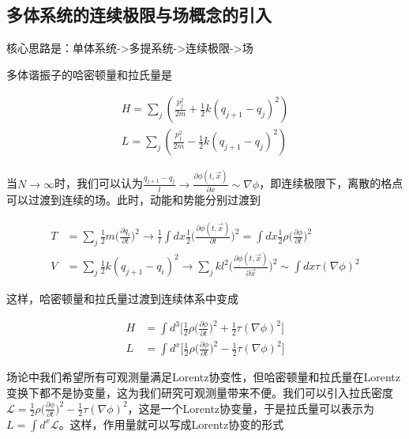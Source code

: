 \subsection{多体系统的连续极限与场概念的引入}

核心思路是：单体系统->多提系统->连续极限->场

多体谐振子的哈密顿量和拉氏量是

\begin{equation}
	\begin{array}{lr}
		H=\sum_{j}(\frac{p_j^2}{2m}+\frac{1}{2}k(q_{j+1}-q_j)^2) \\
		L=\sum_{j}(\frac{p_j^2}{2m}-\frac{1}{2}k(q_{j+1}-q_j)^2)
	\end{array}
\end{equation}

当$N\to\infty$时，我们可以认为$\frac{q_{j+1}-q_j}{l}\to\frac{\partial\phi(t,\vec{x})}{\partial x}\sim\nabla\phi$，即连续极限下，离散的格点可以过渡到连续的场。此时，动能和势能分别过渡到

\begin{equation}
    \begin{split}
        T &= \sum_j\frac{1}{2}m\bigl(\frac{\partial q_i}{\partial t}\bigr)^2 \to \frac{1}{l}\int dx\frac{1}{2}\bigl(\frac{\partial\phi(t,\vec{x})}{\partial t}\bigr)^2 = \int dx\frac{1}{2}\rho\bigl(\frac{\partial\phi}{\partial t}\bigr)^2 \\
        V &= \sum_j\frac{1}{2}k(q_{j+1}-q_i)^2 \to \sum_jkl^2\bigl(\frac{\partial\phi(t,\vec{x})}{\partial \vec{x}}\bigr)^2 \sim \int dx \tau(\nabla\phi)^2
    \end{split}
\end{equation}

这样，哈密顿量和拉氏量过渡到连续体系中变成

\begin{equation}
    \begin{split}
        H &= \int d^3\bigl[\frac{1}{2}\rho\bigl(\frac{\partial\phi}{\partial t}\bigr)^2+\frac{1}{2}\tau(\nabla\phi)^2\bigr] \\
        L &= \int d^x\bigl[\frac{1}{2}\rho\bigl(\frac{\partial\phi}{\partial t}\bigr)^2-\frac{1}{2}\tau(\nabla\phi)^2\bigr]
    \end{split}
\end{equation}

场论中我们希望所有可观测量满足Lorentz协变性，但哈密顿量和拉氏量在Lorentz变换下都不是协变量，这为我们研究可观测量带来不便。我们可以引入拉氏密度$\mathcal{L}=\frac{1}{2}\rho\bigl(\frac{\partial\phi}{\partial t}\bigr)^2-\frac{1}{2}\tau(\nabla\phi)^2$，这是一个Lorentz协变量，于是拉氏量可以表示为$L=\int d^x \mathcal{L}$。这样，作用量就可以写成Lorentz协变的形式

